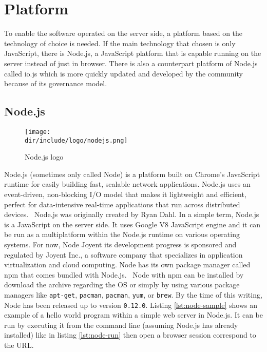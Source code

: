 \section{Platform}
\label{sec:platform}

To enable the software operated on the server side, a platform based on the technology of choice is needed.
If the main technology that chosen is only JavaScript, there is Node.js, a JavaScript platform that is capable running on the server instead of just in browser.
There is also a counterpart platform of Node.js called io.js which is more quickly updated and developed by the community because of its governance model.

\subsection{Node.js}

\begin{wrapfigure}{r}{0.5\textwidth}
  \vspace{-20pt}
  \begin{center}
    \texttt{[image: \\dir/include/logo/nodejs.png]}
  \end{center}
  \vspace{-20pt}
  \caption{Node.js logo}
  \label{fig:nodejs-logo}
  \vspace{-10pt}
\end{wrapfigure}

Node.js\textsuperscript{\textregistered} (sometimes only called Node) is
a platform built on Chrome's JavaScript runtime for easily building fast, scalable network applications.
Node.js uses an event-driven, non-blocking I/O model that makes it lightweight and efficient, perfect for data-intensive real-time applications that run across distributed devices.~\autocite{Joyent:2015:Node}
Node.js was originally created by Ryan Dahl.
In a simple term, Node.js is a JavaScript on the server side.
It uses Google V8 JavaScript engine and it can be run as a multiplatform within the Node.js runtime on various operating systems.
For now, Node Joyent its development progress is sponsored and regulated by Joyent Inc., a software company that specializes in application virtualization and cloud computing.
Node has its own package manager called \ac{npm} that comes bundled with Node.js.~\autocite{Vincent:2014:npm}
Node with npm can be installed by download the archive regarding the \ac{OS} or simply by using various package managers like \verb|apt-get|, \verb|pacman|, \verb|pacman|, \verb|yum|, or \verb|brew|.
By the time of this writing, Node has been released up to version \verb|0.12.0|.
Listing \autoref{lst:node-sample} shows an example of a hello world program within a simple web server in Node.js.
It can be run by executing it from the command line (assuming Node.js has already installed) like in listing \autoref{lst:node-run} then open a browser session correspond to the \ac{URL}.

